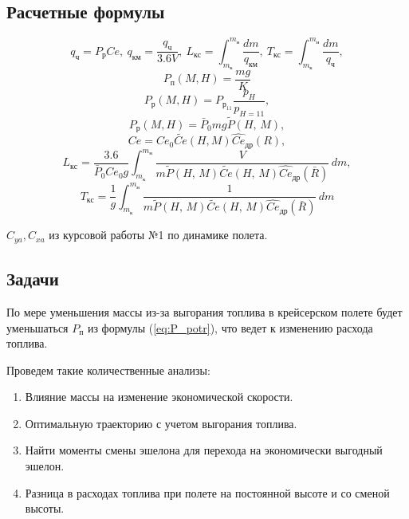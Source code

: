 \subsection{Расчетные формулы} 

\begin{equation}
\label{eq:L_T_integral}
q_{ч}=P_{р} Ce, \: q_{км}=\frac{q_{ч}}{3.6 V}, \: L_{кс}= \int_{m_к}^{m_н} \frac{dm}{q_{км}},\: T_{кс}= \int_{m_к}^{m_н} \frac{dm}{q_{ч}},
\end{equation}
\begin{equation}
    P_п(M, H)= \frac{mg}{K} 
    \label{eq:P_potr}
\end{equation}
\begin{equation}
    P_р(M, H)= P_{р_{11}} \frac{p_H}{p_{H=11}},
\end{equation}
\begin{equation}
    P_р(M, H) = \bar{P}_0 m g \tilde{P}(H,\, M),
\end{equation}
\begin{equation}
Ce = Ce_0 \tilde{Ce}(H,M) \hat{Ce}_{др}(R),
\end{equation}
\begin{equation}
    L_{кс}= \frac{3.6}{\bar{P}_0 Ce_0g} \int_{m_к}^{m_н} \frac{V}{m
    \tilde{P}(H,\,M) \tilde{Ce}(H,\, M) \hat{Ce}_{др}(\bar{R})}   \, dm,
\end{equation}
\begin{equation}
    T_{кс}= \frac{1}{g} \int_{m_к}^{m_н} \frac{1}{m \tilde{P}(H,\,M)
\tilde{Ce}(H,\, M) \hat{Ce}_{др}(\bar{R})}\, dm
\end{equation}

$C_{ya}, C_{xa}$ из курсовой работы №1 по динамике полета.

\subsection{Задачи}
По мере уменьшения массы из-за выгорания топлива в крейсерском полете будет уменьшаться $P_п$ из формулы (\ref{eq:P_potr}), что ведет к изменению расхода топлива.  

Проведем такие количественные анализы:  

\begin{enumerate}
    \item Влияние массы на изменение экономической скорости.
    \item Оптимальную траекторию с учетом выгорания топлива.
    \item Найти моменты смены эшелона для перехода на экономически выгодный эшелон. 
    \item Разница в расходах топлива при полете на постоянной высоте и со сменой высоты.
\end{enumerate}
